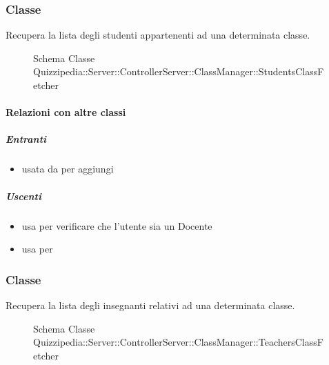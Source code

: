 \subsubsection{Classe }
Recupera la lista degli studenti appartenenti ad una determinata classe.
\begin{figure}[H]
\centering
\noindent{}
\caption[Schema Classe StudentsClassFetcher]{Schema Classe Quizzipedia::Server::ControllerServer::ClassManager::StudentsClassFetcher}
\end{figure}
\paragraph{Relazioni con altre classi}
\subparagraph{Entranti}
\begin{itemize}
\item usata da  per aggiungi
\end{itemize}
\subparagraph{Uscenti}
\begin{itemize}
\item usa  per verificare che l'utente sia un Docente
\item usa  per 
\end{itemize}
\subsubsection{Classe }
Recupera la lista degli insegnanti relativi ad una determinata classe.
\begin{figure}[H]
\centering
\noindent{}
\caption[Schema Classe TeachersClassFetcher]{Schema Classe Quizzipedia::Server::ControllerServer::ClassManager::TeachersClassFetcher}
\end{figure}
